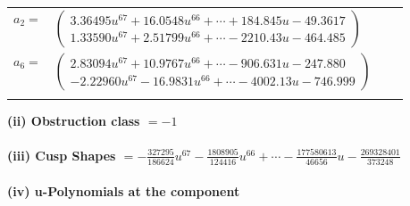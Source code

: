 \documentclass[1p]{elsarticle_modified}
\theoremstyle{definition}
\begin{document}
\begin{tabular}{m{7pt} m{180pt} m{7pt} m{180pt} }
\flushright $a_{2}=$&$\begin{pmatrix}3.36495 u^{67}+16.0548 u^{66}+\cdots+184.845 u-49.3617\\1.33590 u^{67}+2.51799 u^{66}+\cdots-2210.43 u-464.485\end{pmatrix}$ \\
\flushright $a_{6}=$&$\begin{pmatrix}2.83094 u^{67}+10.9767 u^{66}+\cdots-906.631 u-247.880\\-2.22960 u^{67}-16.9831 u^{66}+\cdots-4002.13 u-746.999\end{pmatrix}$\\&\end{tabular}
\flushleft \textbf{(ii) Obstruction class $= -1$}\\~\\
\flushleft \textbf{(iii) Cusp Shapes $= -\frac{327295}{186624} u^{67}-\frac{1808905}{124416} u^{66}+\cdots-\frac{177580613}{46656} u-\frac{269328401}{373248}$}\\~\\
\newpage\renewcommand{\arraystretch}{1}
\flushleft \textbf{(iv) u-Polynomials at the component}\newline \\
\end{document}

